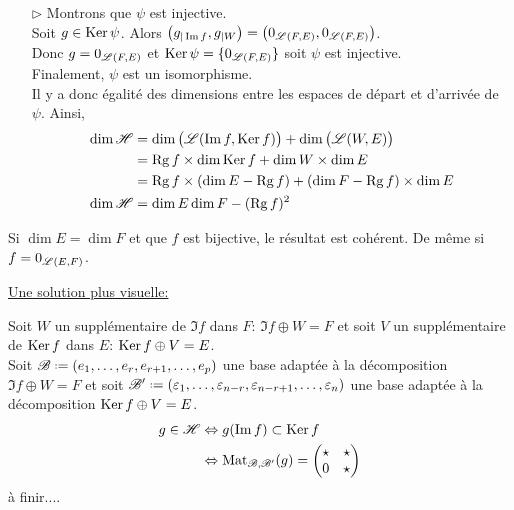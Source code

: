 \begin{solution}
\begin{itemize}
\begin{itemize}
            \item[$\rhd$] Montrons que $\psi$ est injective. \\
            Soit $g \in \mathrm{Ker}\, \psi$. Alors $\left (g_{\vert \Im f}, g_{\vert W} \right) = \left(0_{\mathscr{L}(F, E)}, 0_{\mathscr{L}(F, E)} \right)$. \\
            Donc $g = 0_{\mathscr{L}(F, E)}$ et $\mathrm{Ker}\, \psi = \{ 0_{\mathscr{L}(F, E)} \}$ soit $\psi$ est injective. \\
            Finalement, $\psi$ est un isomorphisme. \\
            Il y a donc égalité des dimensions entre les espaces de départ et d'arrivée de $\psi$. Ainsi,
            \begin{align*}
                \dim \mathscr{H} &= \dim \big(\mathscr{L}(\Im f, \mathrm{Ker}\, f) \big) + \dim \big( \mathscr{L}(W, E) \big) \\
                &= \mathrm{Rg}\, f \times \dim \mathrm{Ker}\, f + \dim W \times \dim E \\
                &= \mathrm{Rg}\, f \times (\dim E - \mathrm{Rg}\, f) + (\dim F - \mathrm{Rg}\, f) \times \dim E \\
                \dim \mathscr{H} &= \dim E \dim F - (\mathrm{Rg}\, f)^2
            \end{align*}
        \end{itemize}
        \begin{remarque}
            Si $\dim E = \dim F$ et que $f$ est bijective, le résultat est cohérent. De même si $f = 0_{\mathscr{L}(E, F)}$.
        \end{remarque}
    \end{itemize}
\end{solution}

\underline{Une solution plus visuelle:}

\begin{solution}
    Soit $W$ un supplémentaire de $\Im f$ dans $F$: $\Im f \oplus W = F$ et soit $V$ un supplémentaire de $\mathrm{Ker}\, f$ dans $E$: $\mathrm{Ker}\, f \oplus V = E$. \\
    Soit $\mathscr{B} \defeq (e_1, \dots, e_r, e_{r+1}, \dots, e_p)$ une base adaptée à la décomposition $\Im f \oplus W = F$ et soit $\mathscr{B}' \defeq (\varepsilon_1, \dots, \varepsilon_{n-r}, \varepsilon_{n-r+1}, \dots, \varepsilon_n)$ une base adaptée à la décomposition $\mathrm{Ker}\, f \oplus V = E$.
    \begin{align*}
        g \in \mathscr{H} &\Leftrightarrow g(\Im f) \subset \mathrm{Ker}\, f \\
        &\Leftrightarrow \mathrm{Mat}_{\mathscr{B}, \mathscr{B}'}(g) = 
        \begin{pmatrix}
            \star & \star \\
            0 & \star
        \end{pmatrix}
    \end{align*}
    à finir....
\end{solution}

